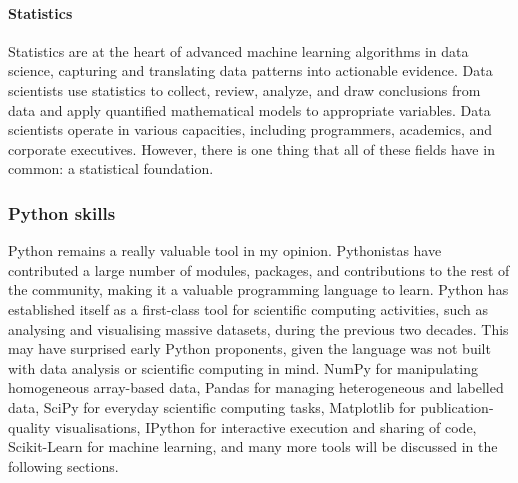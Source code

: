 \documentclass[a4paper, 11pt]{report}
\begin{document}
\paragraph{Statistics}
Statistics are at the heart of advanced machine learning algorithms in data science, capturing and translating data patterns into actionable evidence. Data scientists use statistics to collect, review, analyze, and draw conclusions from data and apply quantified mathematical models to appropriate variables. Data scientists operate in various capacities, including programmers, academics, and corporate executives. However, there is one thing that all of these fields have in common: a statistical foundation. \cite{(How Much Do Data Scientists Need to Know about Statistics?, 2021)}\\
\subsubsection{Python skills}
Python remains a really valuable tool in my opinion. Pythonistas have contributed a large number of modules, packages, and contributions to the rest of the community, making it a valuable programming language to learn. \cite{(Rogel-Salazar, 2020)} Python has established itself as a first-class tool for scientific computing activities, such as analysing and visualising massive datasets, during the previous two decades. This may have surprised early Python proponents, given the language was not built with data analysis or scientific computing in mind. NumPy for manipulating homogeneous array-based data, Pandas for managing heterogeneous and labelled data, SciPy for everyday scientific computing tasks, Matplotlib for publication-quality visualisations, IPython for interactive execution and sharing of code, Scikit-Learn for machine learning, and many more tools will be discussed in the following sections. \cite{(Vanderplas, 2017)}\\
\end{document}
